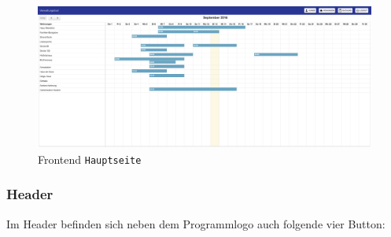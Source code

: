 \begin{figure}[H]
\centering\includegraphics[width=1\textwidth]{images/frontend_mainpage.png}
\caption{Frontend \texttt{Hauptseite}}
\label{Hauptseite}
\end{figure}

\subsubsection{Header}
Im Header befinden sich neben dem Programmlogo auch folgende vier Button:


